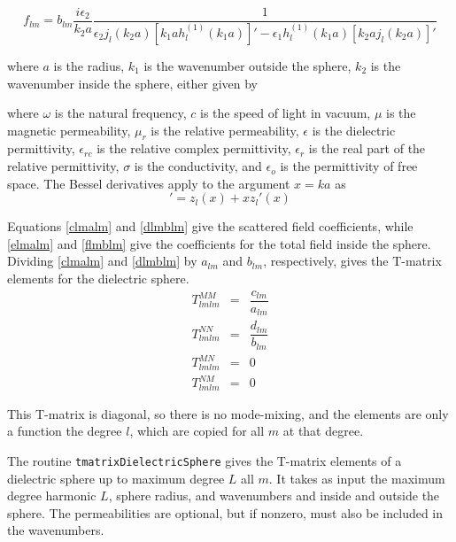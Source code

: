 \begin{equation}
f_{lm} = b_{lm}\dfrac{i\epsilon_2}{k_2a}\dfrac{1}{\epsilon_2 j_l(k_2a) [k_1ah_l^{(1)}(k_1a)]' - \epsilon_1 h_l^{(1)}(k_1a)\left[k_2aj_l(k_2a)\right]' } \label{flmblm}
\end{equation}

\noindent where $a$ is the radius, $k_1$ is the wavenumber outside the sphere, $k_2$ is the wavenumber inside the sphere, either given by 

\noindent where $\omega$ is the natural frequency, $c$ is the speed of light in vacuum, $\mu$ is the magnetic permeability, $\mu_r$ is the relative permeability, $\epsilon$ is the dielectric permittivity, $\epsilon_{rc}$ is the relative complex permittivity, $\epsilon_r$ is the real part of the relative permittivity, $\sigma$ is the conductivity, and $\epsilon_{o}$ is the permittivity of free space.  The Bessel derivatives apply to the argument $x = ka$ as
\begin{equation}
[ x z_l(x)]' = z_l(x) + x z_l'(x) 
\end{equation}

Equations \eqref{clmalm} and \eqref{dlmblm} give the scattered field coefficients, while \eqref{elmalm} and \eqref{flmblm} give the coefficients for the total field inside the sphere. Dividing \eqref{clmalm} and \eqref{dlmblm} by $a_{lm}$ and $b_{lm}$, respectively, gives the T-matrix elements for the dielectric sphere. 
\begin{eqnarray}
T^{MM}_{lmlm}  &=& \dfrac{c_{lm}}{a_{lm}} \label{tmmsphere} \\
T^{NN}_{lmlm} &=&  \dfrac{d_{lm}}{b_{lm}}  \label{tnnsphere}\\
T_{lmlm}^{MN} &=& 0 \\
T_{lmlm}^{NM} &=& 0 
\end{eqnarray}

This T-matrix is diagonal, so there is no mode-mixing, and the elements are only a function the degree $l$, which are copied for all $m$ at that degree. 

The routine \texttt{tmatrixDielectricSphere} gives the T-matrix elements of a dielectric sphere up to maximum degree $L$ all $m$. It takes as input the maximum degree harmonic $L$, sphere radius, and wavenumbers and inside and outside the sphere. The permeabilities are optional, but if nonzero, must also be included in the wavenumbers.  


